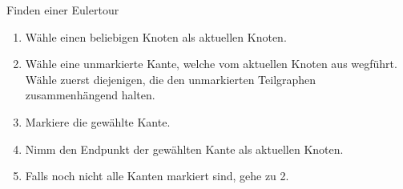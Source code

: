 \begin{frame}[read={Algorithmus von Fleury}, text=small]{Finden einer Eulertour}
  \begin{enumerate}
    \item Wähle einen beliebigen Knoten als aktuellen Knoten.
    \item Wähle eine unmarkierte Kante, welche vom aktuellen Knoten aus wegführt. Wähle zuerst diejenigen,
      die den unmarkierten Teilgraphen zusammenhängend halten.
    \item Markiere die gewählte Kante.
    \item Nimm den Endpunkt der gewählten Kante als aktuellen Knoten.
    \item Falls noch nicht alle Kanten markiert sind, gehe zu 2.
  \end{enumerate}
\end{frame}

